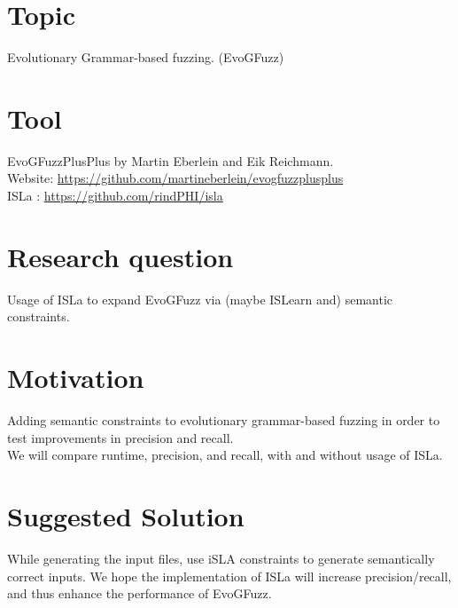 \documentclass{article}
\begin{document}


\newpage
\section{Topic}
Evolutionary Grammar-based fuzzing. (EvoGFuzz)\\

\section{Tool}
EvoGFuzzPlusPlus by Martin Eberlein and Eik Reichmann. \\
Website: \href{https://github.com/martineberlein/evogfuzzplusplus}{https://github.com/martineberlein/evogfuzzplusplus} \\
ISLa : \href{https://github.com/rindPHI/isla}{https://github.com/rindPHI/isla}

\section{Research question}


Usage of ISLa to expand EvoGFuzz via (maybe ISLearn and) semantic constraints. \\

\section{Motivation}
Adding semantic constraints to evolutionary grammar-based fuzzing in order to test improvements in precision and recall. \\
We will compare runtime, precision, and recall, with and without usage of ISLa.

\section{Suggested Solution}
While generating the input files, use iSLA constraints to generate semantically correct inputs. We hope the implementation of ISLa will increase precision/recall, and thus enhance the performance of EvoGFuzz.
\end{document}
